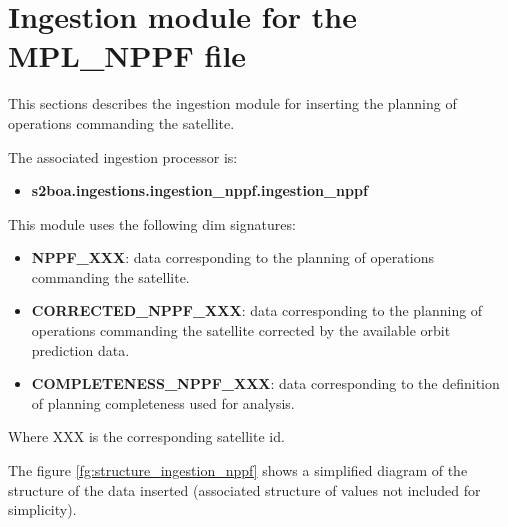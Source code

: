 \section{Ingestion module for the MPL\_NPPF file}

This sections describes the ingestion module for inserting the planning of operations commanding the satellite.

The associated ingestion processor is:

\begin{itemize} 

\item \textbf{s2boa.ingestions.ingestion\_nppf.ingestion\_nppf}
  
\end{itemize}

This module uses the following \acrshort{dim} signatures:

\begin{itemize} 

\item \textbf{NPPF\_XXX}: data corresponding to the planning of operations commanding the satellite.

\item \textbf{CORRECTED\_NPPF\_XXX}: data corresponding to the planning of operations commanding the satellite corrected by the available orbit prediction data.

\item \textbf{COMPLETENESS\_NPPF\_XXX}: data corresponding to the definition of planning completeness used for analysis.
  
\end{itemize}

Where XXX is the corresponding satellite id.

The figure \ref{fg:structure_ingestion_nppf} shows a simplified diagram of the structure of the data inserted (associated structure of values not included for simplicity).

